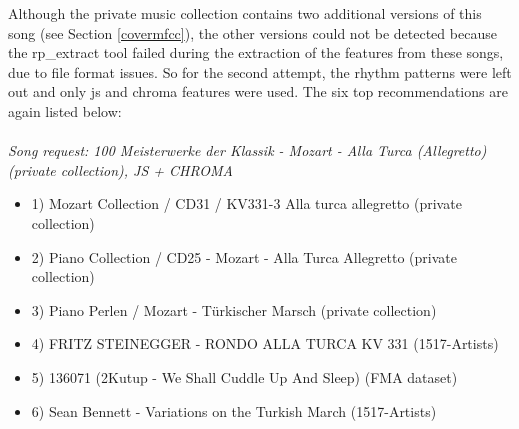 \noindent Although the private music collection contains two additional versions of this song (see Section \ref{covermfcc}), the other versions could not be detected because the rp\_extract tool failed during the extraction of the features from these songs, due to file format issues. So for the second attempt, the rhythm patterns were left out and only js and chroma features were used. The six top recommendations are again listed below:\\
\ \\
\textit{\noindent Song request: 100 Meisterwerke der Klassik - Mozart - Alla Turca (Allegretto) (private collection), JS + CHROMA}

\begin{itemize}
	\setlength\itemsep{-0.5em}
	\item 1) Mozart Collection / CD31 / KV331-3 Alla turca allegretto (private collection)
	\item 2) Piano Collection / CD25 - Mozart - Alla Turca Allegretto (private collection)
	\item 3) Piano Perlen / Mozart - Türkischer Marsch (private collection)
	\item 4) FRITZ STEINEGGER - RONDO ALLA TURCA KV 331 (1517-Artists)
	\item 5) 136071 (2Kutup - We Shall Cuddle Up And Sleep) (FMA dataset) 
	\item 6) Sean Bennett - Variations on the Turkish March (1517-Artists)
\end{itemize}

